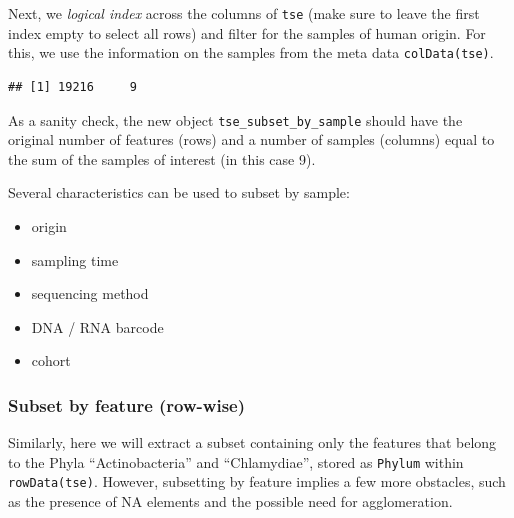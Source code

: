 \documentclass[
]{book}
\newenvironment{Shaded}{\begin{snugshade}}{\end{snugshade}}
\newcommand{\CommentTok}[1]{\textcolor[rgb]{0.56,0.35,0.01}{\textit{#1}}}
\newcommand{\FunctionTok}[1]{\textcolor[rgb]{0.00,0.00,0.00}{#1}}
\newcommand{\NormalTok}[1]{#1}
\newcommand{\OtherTok}[1]{\textcolor[rgb]{0.56,0.35,0.01}{#1}}
\newcommand{\SpecialCharTok}[1]{\textcolor[rgb]{0.00,0.00,0.00}{#1}}
\newcommand{\StringTok}[1]{\textcolor[rgb]{0.31,0.60,0.02}{#1}}
\providecommand{\tightlist}{%
  \setlength{\itemsep}{0pt}\setlength{\parskip}{0pt}}
\begin{document}
Next, we \emph{logical index} across the columns of \texttt{tse} (make sure to
leave the first index empty to select all rows) and filter for the
samples of human origin. For this, we use the information on the
samples from the meta data \texttt{colData(tse)}.

\begin{Shaded}
\end{Shaded}

\begin{verbatim}
## [1] 19216     9
\end{verbatim}

As a sanity check, the new object \texttt{tse\_subset\_by\_sample} should have
the original number of features (rows) and a number of samples
(columns) equal to the sum of the samples of interest (in this case
9).

Several characteristics can be used to subset by sample:

\begin{itemize}
\tightlist
\item
  origin
\item
  sampling time
\item
  sequencing method
\item
  DNA / RNA barcode
\item
  cohort
\end{itemize}

\hypertarget{subset-by-feature-row-wise}{%
\subsubsection{Subset by feature (row-wise)}\label{subset-by-feature-row-wise}}

Similarly, here we will extract a subset containing only the features
that belong to the Phyla ``Actinobacteria'' and ``Chlamydiae'', stored as
\texttt{Phylum} within \texttt{rowData(tse)}. However, subsetting by feature implies
a few more obstacles, such as the presence of NA elements and the
possible need for agglomeration.
\end{document}
